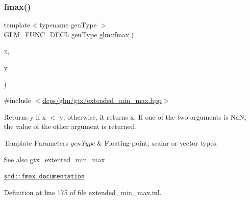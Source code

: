 \mbox{\label{group__gtx__extended__min__max_gae5792cb2b51190057e4aea027eb56f81}} 
\subsubsection{\texorpdfstring{fmax()}{fmax()}\hspace{0.1cm}{\footnotesize\ttfamily [1/3]}}
{\footnotesize\ttfamily template$<$typename gen\+Type $>$ \\
G\+L\+M\+\_\+\+F\+U\+N\+C\+\_\+\+D\+E\+CL gen\+Type glm\+::fmax (\begin{DoxyParamCaption}\item[{gen\+Type}]{x,  }\item[{gen\+Type}]{y }\end{DoxyParamCaption})}



{\ttfamily \#include $<$\hyperlink{extended__min__max_8hpp}{deps/glm/gtx/extended\+\_\+min\+\_\+max.\+hpp}$>$}

Returns y if x $<$ y; otherwise, it returns x. If one of the two arguments is NaN, the value of the other argument is returned.


\begin{DoxyTemplParams}{Template Parameters}
{\em gen\+Type} & Floating-\/point; scalar or vector types.\\
\hline
\end{DoxyTemplParams}
\begin{DoxySeeAlso}{See also}
gtx\+\_\+extented\+\_\+min\+\_\+max 

\href{http://en.cppreference.com/w/cpp/numeric/math/fmax}{\tt std\+::fmax documentation} 
\end{DoxySeeAlso}


Definition at line 175 of file extended\+\_\+min\+\_\+max.\+inl.

\mbox{\label{group__gtx__extended__min__max_gab380df808a15a6a23993e3475d1b94d2}} 
